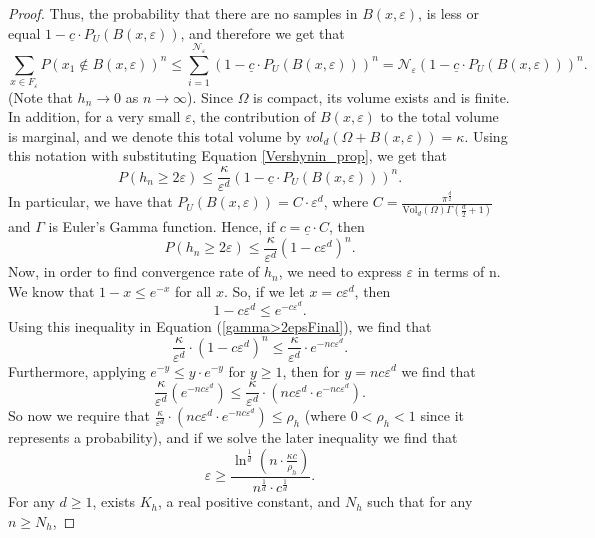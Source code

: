 \documentclass{article}
\begin{document}
\begin{proof}
Thus, the probability that there are no samples in $B(x,\varepsilon)$, is less or equal $ 1- \underline{c}\cdot P_{U}(B(x,\varepsilon))$,
    and therefore we get that 
    \begin{equation}
        \sum_{x \in F_{\varepsilon}} P\left(x_1 \notin B(x,\varepsilon)\right)^n \leq \sum_{i=1}^{\mathcal{N}_\varepsilon}\left(1-\underline{c}\cdot P_{U}(B(x,\varepsilon))\right)^n =\mathcal{N}_\varepsilon\left(1-\underline{c}\cdot P_{U}(B(x,\varepsilon))\right)^n.
    \end{equation}
(Note that $h_n\rightarrow0$ as $n\rightarrow\infty$).
Since $\Omega$ is compact, its volume exists and is finite. In addition, for a very small $\varepsilon$, the contribution of $B(x,\varepsilon)$ to the total volume is marginal, and we denote this total volume by $vol_d(\Omega +B(x,\varepsilon))=\kappa$.  Using this notation with substituting Equation \eqref{Vershynin_prop}, we get that 
    \begin{equation}
        P\left(h_n \geq 2 \varepsilon\right) \leq \frac{\kappa}{\varepsilon ^d}\left(1-\underline{c}\cdot P_{U}(B(x,\varepsilon))\right)^n. \end{equation}
    In particular, we have that $P_{U}(B(x,\varepsilon))=C\cdot\varepsilon^d$, where $C=\frac{\pi^\frac{d}{2}}{\text{Vol}_d(\Omega)\Gamma(\frac{d}{2}+1)}$ and $\Gamma$ is Euler's Gamma function. Hence, if $c=\underline{c}\cdot C$, then
    \begin{equation}
        P\left(h_n \geq 2 \varepsilon\right) \leq \frac{\kappa}{\varepsilon ^d}\left(1-c \varepsilon^d\right)^n. 
        \label{gamma>2epsFinal}
    \end{equation}
Now, in order to find convergence rate of $h_n$, we need to express $\varepsilon$ in terms of n. We know that $1 - x \leq e^{-x}$ for all $x$. So, if we let $x = c\varepsilon^d$, then $$1 - c\varepsilon^d \leq e^{-c \varepsilon^d}.$$
Using this inequality in Equation (\ref{gamma>2epsFinal}), we find that
\begin{equation*}
     \frac{\kappa}{\varepsilon ^d} \cdot\left(1-c \varepsilon^d\right)^n \leq\frac{\kappa}{\varepsilon ^d}\cdot e^{-n c \varepsilon^d}.
\end{equation*}
Furthermore, applying $e^{-y}\leq y\cdot e^{-y}$ for $y\geq 1$, then for $y=nc\varepsilon^d$ we find that
\begin{equation*}
    \frac{\kappa}{\varepsilon ^d}\left(e^{-nc \varepsilon^d}\right) \leq\frac{\kappa}{\varepsilon ^d} \cdot \left(n c\varepsilon^d\cdot e^{-nc \varepsilon^d}\right).
\end{equation*} 
So now we require that $\frac{\kappa}{\varepsilon ^d} \cdot \left(n c\varepsilon^d\cdot e^{-nc\varepsilon^d}\right)\leq\rho_h$ (where $0<\rho_h<1$ since it represents a probability), and if we solve the later inequality we find that 
\begin{equation}
\varepsilon\geq\frac{\ln^\frac{1}{d}(n \cdot \frac{\kappa c}{\rho_h})}{n^\frac{1}{d}\cdot c^\frac{1}{d}}.
    \label{eps.n.d}
\end{equation}
For any  $d\geq 1$, exists $K_h$, a real positive constant, and $N_h$ such that for any $n\geq N_h$,


\end{proof}
\end{document}
